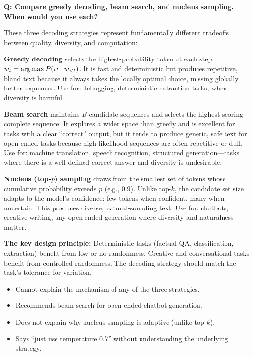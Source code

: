\begin{interviewq}
\textbf{Q: Compare greedy decoding, beam search, and nucleus sampling. When
would you use each?}

 \quad {} \quad \badgefreq{\freqmed}

\stronganswer
These three decoding strategies represent fundamentally different tradeoffs
between quality, diversity, and computation:

\textbf{Greedy decoding} selects the highest-probability token at each step:
$w_t = \operatorname*{arg\,max} P(w \mid w_{<t})$.  It is fast and deterministic but produces
repetitive, bland text because it always takes the locally optimal choice,
missing globally better sequences.  Use for: debugging, deterministic extraction
tasks, when diversity is harmful.

\textbf{Beam search} maintains $B$ candidate sequences and selects the
highest-scoring complete sequence.  It explores a wider space than greedy and is
excellent for tasks with a clear ``correct'' output, but it tends to produce
generic, safe text for open-ended tasks because high-likelihood sequences are
often repetitive or dull.  Use for: machine translation, speech recognition,
structured generation---tasks where there is a well-defined correct answer and
diversity is undesirable.

\textbf{Nucleus (top-$p$) sampling} draws from the smallest set of tokens whose
cumulative probability exceeds $p$ (e.g., 0.9).  Unlike top-$k$, the candidate
set size adapts to the model's confidence: few tokens when confident, many when
uncertain.  This produces diverse, natural-sounding text.  Use for: chatbots,
creative writing, any open-ended generation where diversity and naturalness
matter.

\textbf{The key design principle:}  Deterministic tasks (factual QA,
classification, extraction) benefit from low or no randomness.  Creative and
conversational tasks benefit from controlled randomness.  The decoding strategy
should match the task's tolerance for variation.

\redflags
\begin{itemize}
    \item Cannot explain the mechanism of any of the three strategies.
    \item Recommends beam search for open-ended chatbot generation.
    \item Does not explain why nucleus sampling is adaptive (unlike top-$k$).
    \item Says ``just use temperature 0.7'' without understanding the
          underlying strategy.
\end{itemize}


\end{interviewq}
